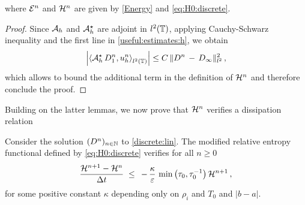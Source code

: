 \documentclass[11pt]{amsart}
\numberwithin{equation}{section}
\numberwithin{figure}{section}
\begin{document}
where ${\mathcal E}^n$ and ${\mathcal H}^n$ are given by \eqref{Energy} and \eqref{eq:H0:discrete}.
\label{lem:2disc}
\el
\begin{proof}
Since ${\mathcal A}_h$ and ${\mathcal A}^{\star}_h$ are adjoint in $l^2({\mathbb T})$, applying Cauchy-Schwarz inequality and the first line in \eqref{useful:estimates:h}, we obtain
\[
\left|
\left\langle
{\mathcal A}_h^\star\, D_1^n, u_h^n\right\rangle_{l^2\left({\mathbb T}\right)}\right|
\leq C\,\|D^n\,-\,D_{\infty}\|_{l^2}^2\,,
\]
which allows to bound the additional term in the definition of ${\mathcal H}^n$ and therefore conclude the proof.
\end{proof}
Building on the latter lemmas, we now prove that ${\mathcal H}^n$ verifies a dissipation relation
\begin{proposition}
	\label{prop:3.4}
	Consider the solution $(D^n)_{n\in{\mathbb N}}$ to \eqref{discrete:lin}. The modified relative entropy functional defined by \eqref{eq:H0:discrete} verifies for all $n\geq 0$
	\[
	\frac{{\mathcal H}^{n+1}
		-{\mathcal H}^{n}}{\Delta t}\;
	\leq\;
	\,-\,\frac{\kappa}{\varepsilon}\,\min{\left(\tau_0,\tau_0^{-1}\right)}\,{\mathcal H}^{n+1}
	\,,
	\]
	for some positive constant $\kappa$ depending only on $\rho_i$ and $T_0$ and $|b-a|$.
\end{proposition}
\end{document}
